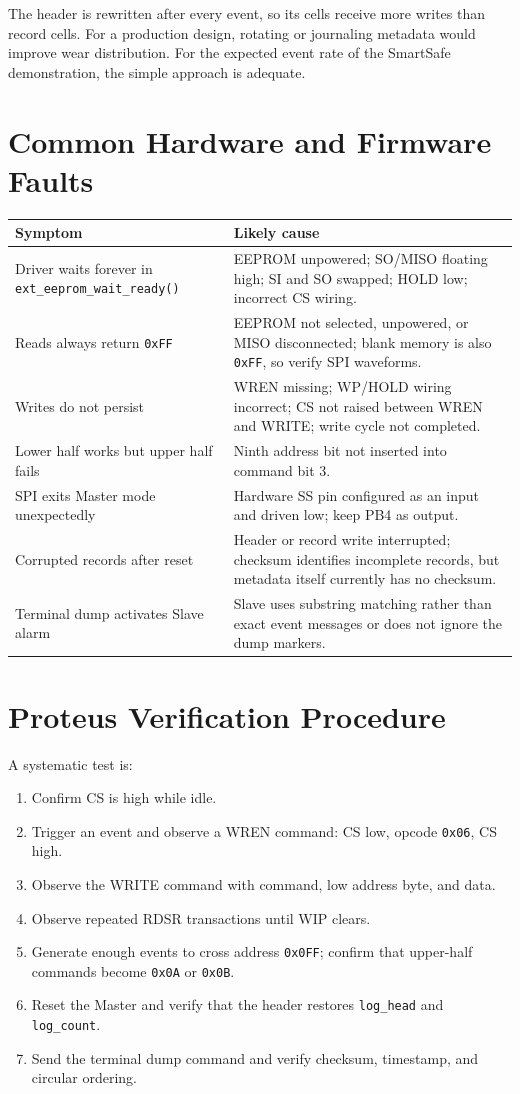 \documentclass[11pt,a4paper]{article}
\begin{document}
The header is rewritten after every event, so its cells receive more writes than record cells. For a production design, rotating or journaling metadata would improve wear distribution. For the expected event rate of the SmartSafe demonstration, the simple approach is adequate.

\section{Common Hardware and Firmware Faults}

\begin{longtable}{p{}p{}}
\toprule
Symptom & Likely cause \\
\midrule
\endhead
Driver waits forever in \texttt{ext\_eeprom\_wait\_ready()} & EEPROM unpowered; SO/MISO floating high; SI and SO swapped; HOLD low; incorrect CS wiring. \\
Reads always return \texttt{0xFF} & EEPROM not selected, unpowered, or MISO disconnected; blank memory is also \texttt{0xFF}, so verify SPI waveforms. \\
Writes do not persist & WREN missing; WP/HOLD wiring incorrect; CS not raised between WREN and WRITE; write cycle not completed. \\
Lower half works but upper half fails & Ninth address bit not inserted into command bit 3. \\
SPI exits Master mode unexpectedly & Hardware SS pin configured as an input and driven low; keep PB4 as output. \\
Corrupted records after reset & Header or record write interrupted; checksum identifies incomplete records, but metadata itself currently has no checksum. \\
Terminal dump activates Slave alarm & Slave uses substring matching rather than exact event messages or does not ignore the dump markers. \\
\bottomrule
\end{longtable}

\section{Proteus Verification Procedure}
A systematic test is:
\begin{enumerate}
  \item Confirm CS is high while idle.
  \item Trigger an event and observe a WREN command: CS low, opcode \texttt{0x06}, CS high.
  \item Observe the WRITE command with command, low address byte, and data.
  \item Observe repeated RDSR transactions until WIP clears.
  \item Generate enough events to cross address \texttt{0x0FF}; confirm that upper-half commands become \texttt{0x0A} or \texttt{0x0B}.
  \item Reset the Master and verify that the header restores \texttt{log\_head} and \texttt{log\_count}.
  \item Send the terminal dump command and verify checksum, timestamp, and circular ordering.
\end{enumerate}
\end{document}
